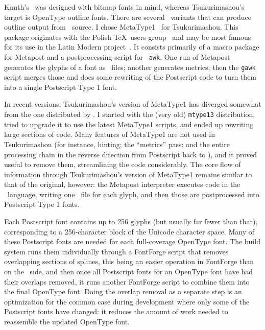 \documentclass{ltugboat}
\begin{document}
Knuth's \MF\ was designed with bitmap fonts in mind, whereas Tsukurimashou's
target is OpenType outline fonts.  There are several \MF\ variants that can
produce outline output from \MF\ source.  I chose
MetaType1~\cite{Jackowski:Programming} for
Tsu\-kurimashou.  This package originates with the Polish \TeX\ users group
\ and may be most famous for its use in the Latin Modern
project~\cite{Jackowski:Latin}.  It consists
primarily of a macro package for Metapost and a postprocessing script for
\GNU\ \texttt{awk}.  One run of Metapost generates the glyphs of a font as
\EPS\ files; another generates metrics; then the \texttt{gawk} script 
\linebreak%
merges
those and does some rewriting of the Postscript code to turn them into a
single Postscript Type 1 font.

In recent versions, Tsukurimashou's version of MetaType1 has diverged
somewhat from the one distributed by .  I started with the (very
old) \texttt{mtype13} distribution, tried to upgrade it to use the latest
MetaType1 scripts, and ended up rewriting large sections of code.  Many
features of MetaType1 are not used in Tsukurimashou (for instance, hinting;
the ``metrics'' pass; and the entire processing chain in the reverse
direction from Postscript back to \MF), and it proved useful to remove them,
streamlining the code considerably.  The core flow of information through
Tsukurimashou's version of MetaType1 remains similar to that of the
original, however: the Metapost interpreter executes code in the \MF\
language, writing one \EPS\ file for each glyph, and then those are
postprocessed into Postscript Type 1 fonts.

Each Postscript font contains up to 256 glyphs (but usually far fewer than
that), corresponding to a 256-character block of the Unicode character
space.  Many of these Postscript fonts are needed for each full-coverage
OpenType font.  The build system runs them individually through a 
\linebreak
FontForge
script that removes overlapping sections of splines, this being an easier
operation in FontForge than on the \MF\ side, and then once all Postscript
fonts for an OpenType font have had their overlaps removed, it runs another
FontForge script to combine them into the final OpenType font.  Doing the
overlap removal as a separate step is an optimization for the common case
during development where only some of the Postscript fonts have changed: it
reduces the amount of work needed to reassemble the updated OpenType font.
\end{document}
